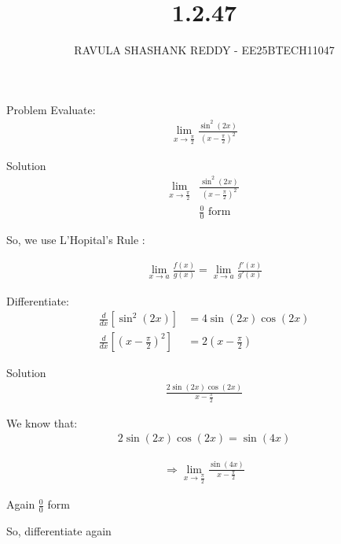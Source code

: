 \documentclass{beamer}
\title{1.2.47}
\author{RAVULA SHASHANK REDDY - EE25BTECH11047}
\date{}
\begin{document}
\frame{\titlepage}

\begin{frame}{Problem}
Evaluate:
\begin{align}
\lim_{x \to \frac{\pi}{2}} \frac{\sin^2(2x)}{\left(x - \frac{\pi}{2}\right)^2}
\end{align}
\end{frame}



\begin{frame}{Solution}
\begin{align}
\lim_{x \to \frac{\pi}{2}} &\frac{\sin^2(2x)}{\left(x - \frac{\pi}{2}\right)^2}\\
&\frac{0}{0} \text{ form}
\end{align}

So, we use L'Hopital's Rule :

\begin{align}
\lim_{x \to a} \frac{f(x)}{g(x)} 
= \lim_{x \to a} \frac{f'(x)}{g'(x)}
\end{align}

Differentiate:
\begin{align}
    \frac{d}{dx}[\sin^2(2x)] &= 4\sin(2x)\cos(2x) \\
\frac{d}{dx}[(x - \frac{\pi}{2})^2] &= 2(x - \frac{\pi}{2})
\end{align}

\end{frame}

\begin{frame}{Solution}
\begin{align}
\frac{2\sin(2x)\cos(2x)}{x - \frac{\pi}{2}}
\end{align}

We know that:
\begin{align}
2\sin(2x)\cos(2x) = \sin(4x)
\end{align}

\begin{align}
\Rightarrow \lim_{x \to \frac{\pi}{2}} \frac{\sin(4x)}{x - \frac{\pi}{2}}
\end{align}
\begin{center}
Again  
$\frac{0}{0}$ form
\end{center}
So, differentiate again
\end{frame}
\end{document}
